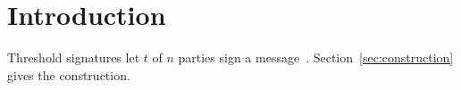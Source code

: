 \section{Introduction}\label{sec:intro}
Threshold signatures let $t$ of $n$ parties sign a message~\cite{shoup2000}.
Section~\ref{sec:construction} gives the construction.
